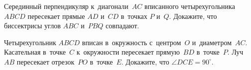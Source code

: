 \begin{problems}
\item
Серединный перпендикуляр к~диагонали~$AC$ вписанного четырехугольника
$ABCD$ пересекает прямые $AD$ и~$CD$ в~точках $P$ и~$Q$.
Докажите, что биссектрисы углов $ABC$ и~$PBQ$ совпадают.

\item
Четырехугольник $ABCD$ вписан в~окружность с~центром~$O$ и~диаметром~$AC$.
Касательная в~точке~$C$ к~окружности пересекает прямую~$BD$ в~точке~$P$.
Луч~$AB$ пересекает отрезок~$PO$ в~точке~$E$.
Докажите, что $\angle DCE = 90^{\circ}$.

\end{problems}

